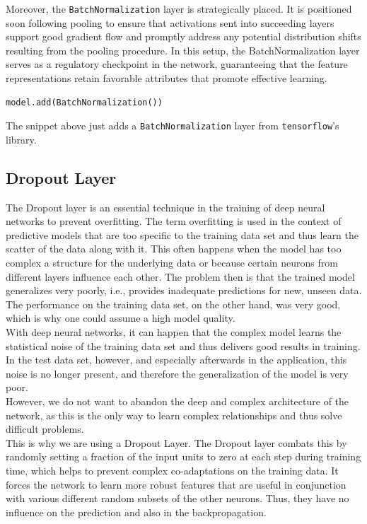 Moreover, the \verb|BatchNormalization| layer is strategically placed. It is positioned soon following pooling to ensure that activations sent into succeeding layers support good gradient flow and promptly address any potential distribution shifts resulting from the pooling procedure. In this setup, the BatchNormalization layer serves as a regulatory checkpoint in the network, guaranteeing that the feature representations retain favorable attributes that promote effective learning.

\begin{lstlisting}[language=Python]
model.add(BatchNormalization())
\end{lstlisting}
The snippet above just adds a \verb|BatchNormalization| layer from \verb|tensorflow|'s library.

\subsection{Dropout Layer}
The Dropout layer is an essential technique in the training of deep neural networks to prevent overfitting. The term overfitting is used in the context of predictive models that are too specific to the training data set and thus learn the scatter of the data along with it. This often happens when the model has too complex a structure for the underlying data or because certain neurons from different layers influence each other.  The problem then is that the trained model generalizes very poorly, i.e., provides inadequate predictions for new, unseen data. The performance on the training data set, on the other hand, was very good, which is why one could assume a high model quality.\\
With deep neural networks, it can happen that the complex model learns the statistical noise of the training data set and thus delivers good results in training. In the test data set, however, and especially afterwards in the application, this noise is no longer present, and therefore the generalization of the model is very poor.
\\

However, we do not want to abandon the deep and complex architecture of the network, as this is the only way to learn complex relationships and thus solve difficult problems.\\

This is why we are using a Dropout Layer. The Dropout layer combats this by randomly setting a fraction of the input units to zero at each step during training time, which helps to prevent complex co-adaptations on the training data. It forces the network to learn more robust features that are useful in conjunction with various different random subsets of the other neurons.  Thus, they have no influence on the prediction and also in the backpropagation. \\

